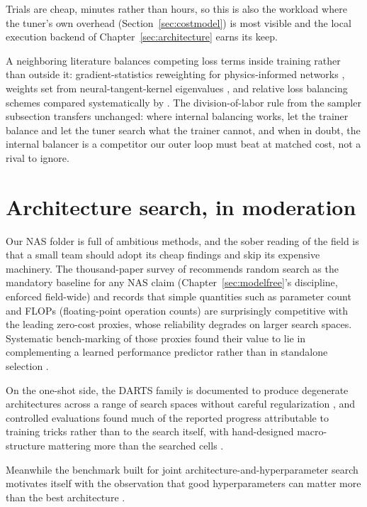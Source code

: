 Trials are cheap,
minutes rather than hours, so this is also the workload where the
tuner's own overhead (Section~\ref{sec:costmodel}) is most visible and
the local execution backend of Chapter~\ref{sec:architecture} earns its
keep.

A neighboring literature balances competing loss terms inside training
rather than outside it: gradient-statistics reweighting for
physics-informed networks \citep{wang2020pathologies}, weights set
from neural-tangent-kernel eigenvalues \citep{wang2020ntk}, and relative
loss balancing schemes compared systematically by
\citet{bischof2025relobralo}. The division-of-labor rule from the
sampler subsection transfers unchanged: where internal balancing works,
let the trainer balance and let the tuner search what the trainer
cannot, and when in doubt, the internal balancer is a competitor our
outer loop must beat at matched cost, not a rival to ignore.

\section{Architecture search, in moderation}

Our NAS folder is full of ambitious methods, and the sober reading of the
field is that a small team should adopt its cheap findings and skip its
expensive machinery. The thousand-paper survey of \citet{white2023nas1000}
recommends random search as the mandatory baseline for any NAS claim
(Chapter~\ref{sec:modelfree}'s discipline, enforced field-wide) and
records that simple quantities such as parameter count and FLOPs
(floating-point operation counts) are
surprisingly competitive with the leading zero-cost proxies, whose
reliability degrades on larger search spaces. Systematic bench-marking of
those proxies found their value to lie in complementing a learned
performance predictor rather than in standalone selection
\citep{krishnakumar2022nasbenchsuite}.

On the one-shot side, the DARTS
family is documented to produce degenerate architectures across a range
of search spaces without careful regularization \citep{zela2020robustifying},
and controlled evaluations found much of the reported progress
attributable to training tricks rather than to the search itself, with
hand-designed macro-structure mattering more than the searched cells
\citep{yang2020frustratingly}.

Meanwhile the benchmark built for joint
architecture-and-hyperparameter search motivates itself with the
observation that good hyperparameters can matter more than the best
architecture \citep{bansal2022jahs}.

